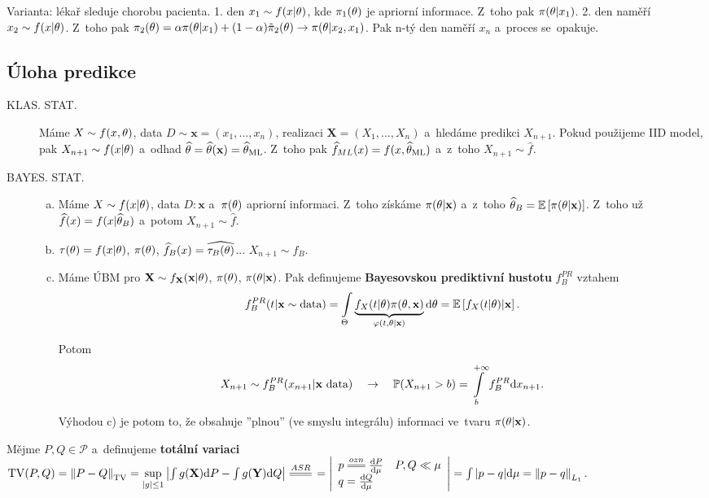 \begin{example}
	Varianta: lékař sleduje chorobu pacienta. 1. den $x_1\sim f(x|\theta)$, kde $\pi_1(\theta)$ je apriorní informace. Z~toho pak $\pi(\theta|x_1)$. 2. den naměří $x_2\sim f(x|\theta)$. Z~toho pak $\pi_2(\theta)=\alpha\pi(\theta| x_1)+(1-\alpha)\tilde{\pi}_2(\theta)\to \pi(\theta|x_2,x_1)$. Pak n-tý den naměří $x_n$ a~proces se~opakuje.
\end{example}
\subsection*{Úloha predikce}
\begin{description}
	\item[KLAS. STAT.] Máme $X\sim f(x,\theta)$, data $D\sim\textbf{x}=(x_1,...,x_n)$, realizaci $\textbf{X}=(X_1,...,X_n)$ a~hledáme predikci $X_{n+1}$. Pokud použijeme IID model, pak $X_{n+1}\sim f(x|\theta)$ a~odhad $\widehat{\theta}=\widehat{\theta}(\textbf{x})=\widehat{\theta}_{\mathrm{ML}}$. Z~toho pak $\widehat{f}_{ML}(x)=f(x,\widehat{\theta}_\mathrm{ML})$ a~z~toho $X_{n+1}\sim\widehat{f}$.
	\item[BAYES. STAT.] \begin{enumerate}[a)]
		\item Máme $X\sim f(x|\theta)$, data $D:\textbf{x}$ a~$\pi(\theta)$ apriorní informaci. Z~toho získáme $\pi(\theta|\textbf{x})$ a~z~toho $\widehat{\theta}_B=\mathbb{E}\left[ \pi(\theta|\textbf{x}) \right]$. Z~toho už $\widehat{f}(x)=f(x|\widehat{\theta}_B)$ a~potom $X_{n+1}\sim\widehat{f}$.
		\item $\tau(\theta)=f(x|\theta)$, $\pi(\theta)$, $\widehat{f}_B(x)=\widehat{\tau_B(\theta)}$... $X_{n+1}\sim\widehat{f}_B$.
		\item \begin{define} Máme ÚBM pro $\textbf{X}\sim f_{\textbf{X}}(\textbf{x}|\theta)$, $\pi(\theta)$, $\pi(\theta|\textbf{x})$. Pak definujeme \textbf{Bayesovskou prediktivní hustotu} $f_B^{PR} $ vztahem
		$$ f_B^{PR}(t|\textbf{x}\sim\text{data})=\int\limits_{\Theta} \underbrace{f_X(t|\theta)\pi(\theta,\textbf{x})}_{\varphi(t,\theta|\textbf{x})}\mathrm{d}\theta=\mathbb{E}\left[ f_X(t|\theta)|\textbf{x} \right].$$
		\end{define}
		Potom
		$$ X_{n+1}\sim f_B^{PR}(x_{n+1}|\textbf{x}\text{ data})\quad\to\quad \mathbb{P}(X_{n+1}>b)=\int\limits_b^{+\infty}f_B^{PR}\mathrm{d} x_{n+1}.$$
		Výhodou c) je potom to, že obsahuje ''plnou'' (ve smyslu integrálu) informaci ve~tvaru $\pi(\theta|\textbf{x})$.
	\end{enumerate}
\end{description}
\begin{define}
	Mějme $P,Q\in\mathcal{P}$ a~definujeme \textbf{totální variaci} $\TV(P,Q)=\left\|P-Q\right\|_\TV=\sup\limits_{|g|\leq 1}\left| \int g(\X)\d P-\int g(\Y)\d Q \right|\equal{ASR}=\left|\begin{array}{l}
	p\equal{ozn}\frac{\d P}{\d \mu}\quad P,Q\ll\mu\\ q=\frac{\d Q}{\d \mu}
	\end{array}
	\right|=\int |p-q|\d\mu=\left\|p-q\right\|_{L_1}$.
\end{define}
